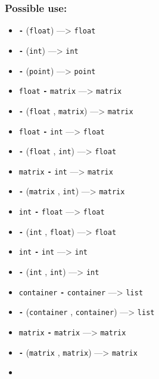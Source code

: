 \documentclass[]{book}
\providecommand{\tightlist}{%
  \setlength{\itemsep}{0pt}\setlength{\parskip}{0pt}}
\theoremstyle{definition}
\theoremstyle{definition}
\theoremstyle{definition}
\theoremstyle{remark}
\begin{document}
\subsubsection{Possible use:}\label{possible-use}

\begin{itemize}
\tightlist
\item
  \textbf{\texttt{-}} (\texttt{float}) ---\textgreater{} \texttt{float}
\item
  \textbf{\texttt{-}} (\texttt{int}) ---\textgreater{} \texttt{int}
\item
  \textbf{\texttt{-}} (\texttt{point}) ---\textgreater{} \texttt{point}
\item
  \texttt{float} \textbf{\texttt{-}} \texttt{matrix} ---\textgreater{}
  \texttt{matrix}
\item
  \textbf{\texttt{-}} (\texttt{float} , \texttt{matrix})
  ---\textgreater{} \texttt{matrix}
\item
  \texttt{float} \textbf{\texttt{-}} \texttt{int} ---\textgreater{}
  \texttt{float}
\item
  \textbf{\texttt{-}} (\texttt{float} , \texttt{int}) ---\textgreater{}
  \texttt{float}
\item
  \texttt{matrix} \textbf{\texttt{-}} \texttt{int} ---\textgreater{}
  \texttt{matrix}
\item
  \textbf{\texttt{-}} (\texttt{matrix} , \texttt{int}) ---\textgreater{}
  \texttt{matrix}
\item
  \texttt{int} \textbf{\texttt{-}} \texttt{float} ---\textgreater{}
  \texttt{float}
\item
  \textbf{\texttt{-}} (\texttt{int} , \texttt{float}) ---\textgreater{}
  \texttt{float}
\item
  \texttt{int} \textbf{\texttt{-}} \texttt{int} ---\textgreater{}
  \texttt{int}
\item
  \textbf{\texttt{-}} (\texttt{int} , \texttt{int}) ---\textgreater{}
  \texttt{int}
\item
  \texttt{container} \textbf{\texttt{-}} \texttt{container}
  ---\textgreater{} \texttt{list}
\item
  \textbf{\texttt{-}} (\texttt{container} , \texttt{container})
  ---\textgreater{} \texttt{list}
\item
  \texttt{matrix} \textbf{\texttt{-}} \texttt{matrix} ---\textgreater{}
  \texttt{matrix}
\item
  \textbf{\texttt{-}} (\texttt{matrix} , \texttt{matrix})
  ---\textgreater{} \texttt{matrix}
\item

\end{itemize}
\end{document}
